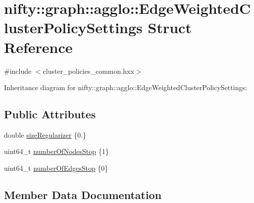 \hypertarget{structnifty_1_1graph_1_1agglo_1_1EdgeWeightedClusterPolicySettings}{}\section{nifty\+:\+:graph\+:\+:agglo\+:\+:Edge\+Weighted\+Cluster\+Policy\+Settings Struct Reference}
\label{structnifty_1_1graph_1_1agglo_1_1EdgeWeightedClusterPolicySettings}


{\ttfamily \#include $<$cluster\+\_\+policies\+\_\+common.\+hxx$>$}



Inheritance diagram for nifty\+:\+:graph\+:\+:agglo\+:\+:Edge\+Weighted\+Cluster\+Policy\+Settings\+:
\subsection*{Public Attributes}
\begin{DoxyCompactItemize}
\item 
double \hyperlink{structnifty_1_1graph_1_1agglo_1_1EdgeWeightedClusterPolicySettings_a16830167af377ff60fd7831c4ca30074}{size\+Regularizer} \{0.\}
\item 
uint64\+\_\+t \hyperlink{structnifty_1_1graph_1_1agglo_1_1EdgeWeightedClusterPolicySettings_a09a8f5ef7a4a14304439367054bf64cc}{number\+Of\+Nodes\+Stop} \{1\}
\item 
uint64\+\_\+t \hyperlink{structnifty_1_1graph_1_1agglo_1_1EdgeWeightedClusterPolicySettings_a34f45712a326b7e635a6ec6419bfe42b}{number\+Of\+Edges\+Stop} \{0\}
\end{DoxyCompactItemize}


\subsection{Member Data Documentation}
\hypertarget{structnifty_1_1graph_1_1agglo_1_1EdgeWeightedClusterPolicySettings_a34f45712a326b7e635a6ec6419bfe42b}{}

